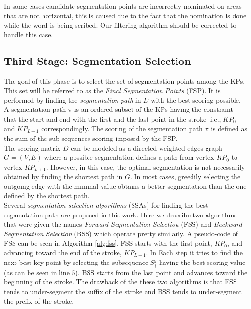 \documentclass[10pt, conference, compsocconf]{IEEEtran}
\begin{document}
In some cases candidate segmentation points are incorrectly nominated on areas that are not horizontal, this is caused due to the fact that the nomination is done while the word is being scribed. Our filtering algorithm should be corrected to handle this case.\\

\subsection{Third Stage: Segmentation Selection}
The goal of this phase is to select the set of segmentation points among the KPs. 
This set will be referred to as the \emph{Final Segmentation Points} (FSP). 
It is performed by finding the \emph{segmentation path} in $D$ with the best scoring possible. 
A segmentation path $\pi$ is an ordered subset of the KPs having the constraint that the start and end with the first and the last point in the stroke, i.e., $KP_{0}$ and $KP_{L+1}$ correspondingly.
The scoring of the segmentation path $\pi$ is defined as the sum of the sub-sequences scoring imposed by the FSP.\\

The scoring matrix $D$ can be modeled as a directed weighted edges graph $G=(V,E)$ where a possible segmentation defines a path from vertex $KP_0$ to vertex $KP_{L+1}$. However, in this case, the optimal segmentation is not necessarily obtained by finding the shortest path in $G$. In most cases, greedily selecting the outgoing edge with the minimal value obtains a better segmentation than the one defined by the shortest path.\\

Several \emph{segmentation selection algorithms} (SSAs) for finding the best segmentation path are proposed in this work.
Here we describe two algorithms that were given the names \emph{Forward Segmentation Selection} (FSS) and \emph{Backward Segmentation Selection} (BSS) which operate pretty similarly. A pseudo-code of FSS can be seen in Algorithm \ref{alg:fss}. FSS starts with the first point, $KP_0$, and advancing toward the end of the stroke, $KP_{L+1}$. In Each step it tries to find the next best key point by selecting the subsequence $S_i^j$ having the best scoring value (as can be seen in line 5). BSS starts from the last point and advances toward the beginning of the stroke. The drawback of the these two algorithms is that FSS tends to under-segment the suffix of the stroke and BSS tends to under-segment the prefix of the stroke.\\
\end{document}

